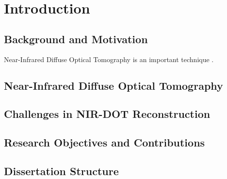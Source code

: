 
\chapter{Introduction}

\section{Background and Motivation}
Near-Infrared Diffuse Optical Tomography is an important technique \cite{sample2024}.

\section{Near-Infrared Diffuse Optical Tomography}

\section{Challenges in NIR-DOT Reconstruction}

\section{Research Objectives and Contributions}

\section{Dissertation Structure}

